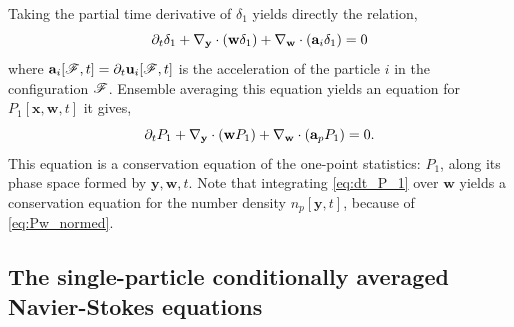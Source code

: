 Taking the partial time derivative of $\delta_1$ yields directly the relation, 
\begin{equation}
    \pddt\delta_1 
    + \pddy\cdot(\textbf{w}\delta_1)
    + \pddw\cdot(\textbf{a}_i\delta_1)
    = 0 
    \label{eq:dt_delta_1}
\end{equation}
where $\textbf{a}_i[\mathscr{F},t] = \partial_t \textbf{u}_i[\mathscr{F},t]$ is the acceleration of the particle $i$ in the configuration $\mathscr{F}$. 
Ensemble averaging this equation yields an equation for  $P_1[\textbf{x},\textbf{w},t]$ it gives, 
\begin{equation}
    \pddt P_1
    + \pddy\cdot(\textbf{w}  P_1)
    + \pddw\cdot(\textbf{a}_p P_1)
    = 0.
    \label{eq:dt_P_1}
\end{equation}
This equation is a conservation equation of the one-point statistics: $P_1$,  along its phase space formed by $\textbf{y},\textbf{w},t$. 
Note that integrating \ref{eq:dt_P_1} over $\textbf{w}$ yields a conservation equation for the number density $n_p[\textbf{y},t]$, because of \ref{eq:Pw_normed}.  

\subsection{The single-particle conditionally averaged  Navier-Stokes equations}


